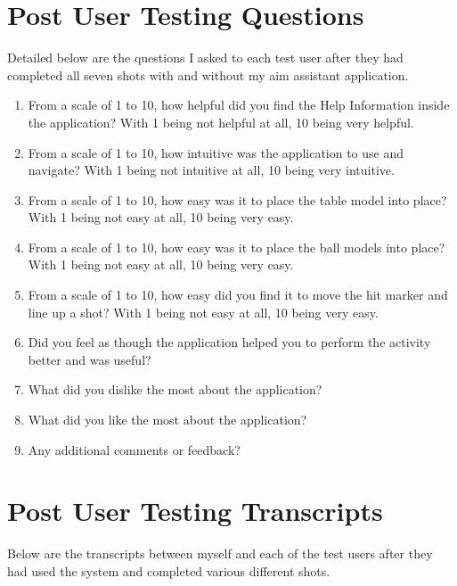 \documentclass[ %
                author={Finn Alexander Wilkinson},
                supervisor={Dr. Andrew Calway},
                degree={MEng},
                title={\centering A Mixed Reality Aim Assistant for Pool and Snooker},
                subtitle={},
                type={Enterprise},
                year={2021} ]{dissertation}
\begin{document}
\chapter{Post User Testing Questions}
\label{appx:userTestQuestions}
Detailed below are the questions I asked to each test user after they had completed all seven shots with and without my aim assistant application.
\begin{enumerate}
    \item From a scale of 1 to 10, how helpful did you find the Help Information inside the application? With 1 being not helpful at all, 10 being very helpful. 
    \item From a scale of 1 to 10, how intuitive was the application to use and navigate? With 1 being not intuitive at all, 10 being very intuitive.
    \item From a scale of 1 to 10, how easy was it to place the table model into place? With 1 being not easy at all, 10 being very easy.
    \item From a scale of 1 to 10, how easy was it to place the ball models into place? With 1 being not easy at all, 10 being very easy.
    \item From a scale of 1 to 10, how easy did you find it to move the hit marker and line up a shot? With 1 being not easy at all, 10 being very easy.
    \item Did you feel as though the application helped you to perform the activity better and was useful?
    \item What did you dislike the most about the application?
    \item What did you like the most about the application?
    \item Any additional comments or feedback?
\end{enumerate}




\chapter{Post User Testing Transcripts}
\label{appx:userTestTranscripts}
Below are the transcripts between myself and each of the test users after they had used the system and completed various different shots.
\end{document}
